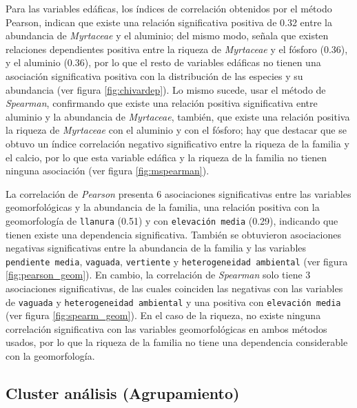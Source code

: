\documentclass[11pt,]{article}
\begin{document}
Para las variables edáficas, los índices de correlación obtenidos por el
método Pearson, indican que existe una relación significativa positiva
de 0.32 entre la abundancia de \emph{Myrtaceae} y el aluminio; del mismo
modo, señala que existen relaciones dependientes positiva entre la
riqueza de \emph{Myrtaceae} y el fósforo (0.36), y el aluminio (0.36),
por lo que el resto de variables edáficas no tienen una asociación
significativa positiva con la distribución de las especies y su
abundancia (ver figura \ref{fig:chivardep}). Lo mismo sucede, usar el
método de \emph{Spearman}, confirmando que existe una relación positiva
significativa entre aluminio y la abundancia de \emph{Myrtaceae},
también, que existe una relación positiva la riqueza de \emph{Myrtaceae}
con el aluminio y con el fósforo; hay que destacar que se obtuvo un
índice correlación negativo significativo entre la riqueza de la familia
y el calcio, por lo que esta variable edáfica y la riqueza de la familia
no tienen ninguna asociación (ver figura \ref{fig:mspearman}).

La correlación de \emph{Pearson} presenta 6 asociaciones significativas
entre las variables geomorfológicas y la abundancia de la familia, una
relación positiva con la geomorfología de \texttt{llanura} (0.51) y con
\texttt{elevación\ media} (0.29), indicando que tienen existe una
dependencia significativa. También se obtuvieron asociaciones negativas
significativas entre la abundancia de la familia y las variables
\texttt{pendiente\ media}, \texttt{vaguada}, \texttt{vertiente} y
\texttt{heterogeneidad\ ambiental} (ver figura \ref{fig:pearson_geom}).
En cambio, la correlación de \emph{Spearman} solo tiene 3 asociaciones
significativas, de las cuales coinciden las negativas con las variables
de \texttt{vaguada} y \texttt{heterogeneidad\ ambiental} y una positiva
con \texttt{elevación\ media} (ver figura \ref{fig:spearm_geom}). En el
caso de la riqueza, no existe ninguna correlación significativa con las
variables geomorfológicas en ambos métodos usados, por lo que la riqueza
de la familia no tiene una dependencia considerable con la
geomorfología.

\subsection{Cluster análisis
(Agrupamiento)}\label{cluster-anuxe1lisis-agrupamiento}
\end{document}
